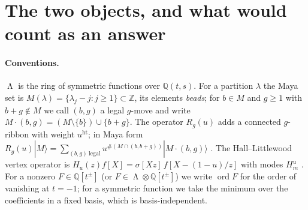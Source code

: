 \documentclass[11pt]{article}
\theoremstyle{definition}
\DeclareMathOperator{\Lam}{\Lambda}
\newcommand{\Z}{\mathbb{Z}}
\newcommand{\Q}{\mathbb{Q}}
\newcommand{\hgt}{\operatorname{ht}}
\newcommand{\ord}{\operatorname{ord}}
\newcommand{\Hop}{H}
\begin{document}
\begin{abstract}
Two objects produced on 8 September 2026 each carry a factor $(1+t)$, and both vanish at
$t=-1$ in the crude sense that made the coincidence tempting.  \textbf{(A)} is the one-bead
sector of the cross-rank ribbon commutator $[R_e(t),R_f(s)]$ restricted to the hyperbola
$ts=1$; \textbf{(B)} is the multiplication operator $h_{m+n}[(1+t)X]$ that measures the
failure of the Hall--Littlewood vertex-operator modes to generate a quantum torus on the
same hyperbola.  We settle whether they are one object.  On the ribbon side we obtain the
closed form
$\langle M'|[R_e(t),R_f(t^{-1})]|M\rangle=(-1)^{N}(-t)^{P}\bigl(1-(-t)^{\kappa}\bigr)$
for a single integer $\kappa$ read off the Maya diagram, from which the matrix element is
zero iff $\kappa=0$ and otherwise has order of vanishing \emph{exactly} $1$ at $t=-1$,
uniformly in $e,f$ and in the bead configuration.  On the vertex side the matrix elements of
$h_N[(1+t)X]$ are palindromic, hence their order of vanishing at $t=-1$ is congruent to $N$
mod $2$; for $N$ even it is never $1$ and is $0$ on an explicit family.  The two order
functions therefore disagree, and no dictionary between the parameter sets repairs them.
Separately we locate the $(1+t)$ of (B): it is not a Wick constant.  The contraction
constant of the vertex operators is $(z_1-z_2)/(z_1-tz_2)$, with twist alphabet $(1-t)$
exactly as published by Necoechea--Rozhkovskaya; its \emph{pole} sits at $z_1=tz_2$, and
$(1+t)X$ is the doubled \emph{creation} alphabet $\sigma[Xz_1]\sigma[Xz_2]$ evaluated at
that pole.  Unpinning the zero of the contraction --- a parameter forced to $1$ by the
Hall--Littlewood normalisation --- moves the twist alphabet while leaving $(1+t)$ fixed,
which is a varying test that no shape match survives.
\end{abstract}

\section{The two objects, and what would count as an answer}

\paragraph{Conventions.}
$\Lam$ is the ring of symmetric functions over $\Q(t,s)$.  For a partition $\lambda$ the
Maya set is $M(\lambda)=\{\lambda_j-j:j\ge1\}\subset\Z$, its elements \emph{beads}; for
$b\in M$ and $g\ge1$ with $b+g\notin M$ we call $(b,g)$ a legal $g$-move and write
$M\cdot(b,g)=(M\setminus\{b\})\cup\{b+g\}$.  The operator $R_g(u)$ adds a connected
$g$-ribbon with weight $u^{\hgt}$; in Maya form
$R_g(u)|M\rangle=\sum_{(b,g)\ \mathrm{legal}}u^{\#(M\cap(b,b+g))}|M\cdot(b,g)\rangle$
\cite[Prop.~2.2]{Q92}.  The Hall--Littlewood vertex operator is
$\Hop_u(z)f[X]=\sigma[Xz]\,f[X-(1-u)/z]$ with modes $\Hop^u_m$
\cite[Def.~1.1]{Q99}.  For a nonzero $F\in\Q[t^{\pm}]$ (or $F\in\Lam\otimes\Q[t^{\pm}]$)
we write $\ord F$ for the order of vanishing at $t=-1$; for a symmetric function we take
the minimum over the coefficients in a fixed basis, which is basis-independent.
\end{document}
